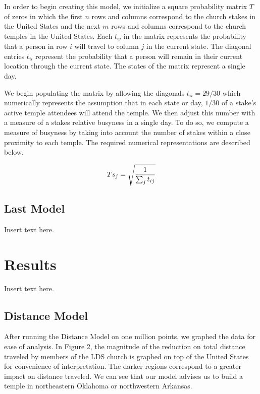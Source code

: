 \documentclass[twoside,twocolumn]{article}
\begin{document}
In order to begin creating this model, we initialize a square probability matrix $T$ of zeros in which the first $n$ rows and columns correspond to the church stakes in the United States and the next $m$ rows and columns correspond to the church temples in the United States.
Each $t_{ij}$ in the matrix represents the probability that a person in row $i$ will travel to column $j$ in the current state. The diagonal entries $t_{ii}$ represent the probability that a person will remain in their current location through the current state.
The states of the matrix represent a single day.

We begin populating the matrix by allowing the diagonals $t_{ii} = 29/30$ which numerically represents the assumption that in each state or day, $1/30$ of a stake's active temple attendees will attend the temple.
We then adjust this number with a measure of a stakes relative busyness in a single day.
To do so, we compute a measure of busyness by taking into account the number of stakes within a close proximity to each temple.
The required numerical representations are described below.

\begin{equation}
\begin{aligned}
Ts_j = \sqrt{1\over{\sum_j{t_{ij}}}}
\end{aligned}
\end{equation}


\subsection{Last Model} %
Insert text here.

\section{Results}
\label{sec:res}
Insert text here.

\subsection{Distance Model}
After running the Distance Model on one million points, we graphed the data for ease of analysis.
In Figure 2, the magnitude of the reduction on total distance traveled by members of the LDS church is graphed on top of the United States for convenience of interpretation.
The darker regions correspond to a greater impact on distance traveled.
We can see that our model advises us to build a temple in northeastern Oklahoma or northwestern Arkansas.
\end{document}

